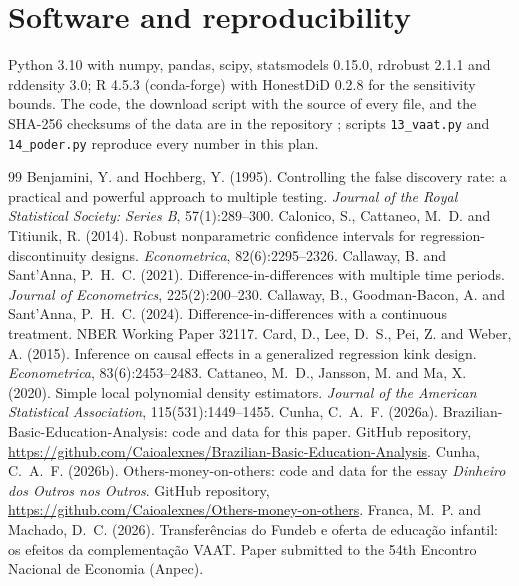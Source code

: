 \documentclass[11pt]{article}
\begin{document}
\section{Software and reproducibility}

Python 3.10 with numpy, pandas, scipy, statsmodels 0.15.0, rdrobust 2.1.1 and rddensity 3.0; R 4.5.3 (conda-forge) with HonestDiD 0.2.8 for the sensitivity bounds. The code, the download script with the source of every file, and the SHA-256 checksums of the data are in the repository \citep{cunha2026a}; scripts \texttt{13\_vaat.py} and \texttt{14\_poder.py} reproduce every number in this plan.

\begin{thebibliography}{99}
 Benjamini, Y. and Hochberg, Y. (1995). Controlling the false discovery rate: a practical and powerful approach to multiple testing. \textit{Journal of the Royal Statistical Society: Series B}, 57(1):289--300.
 Calonico, S., Cattaneo, M.~D. and Titiunik, R. (2014). Robust nonparametric confidence intervals for regression-discontinuity designs. \textit{Econometrica}, 82(6):2295--2326.
 Callaway, B. and Sant'Anna, P.~H.~C. (2021). Difference-in-differences with multiple time periods. \textit{Journal of Econometrics}, 225(2):200--230.
 Callaway, B., Goodman-Bacon, A. and Sant'Anna, P.~H.~C. (2024). Difference-in-differences with a continuous treatment. NBER Working Paper 32117.
 Card, D., Lee, D.~S., Pei, Z. and Weber, A. (2015). Inference on causal effects in a generalized regression kink design. \textit{Econometrica}, 83(6):2453--2483.
 Cattaneo, M.~D., Jansson, M. and Ma, X. (2020). Simple local polynomial density estimators. \textit{Journal of the American Statistical Association}, 115(531):1449--1455.
 Cunha, C.~A.~F. (2026a). Brazilian-Basic-Education-Analysis: code and data for this paper. GitHub repository, \url{https://github.com/Caioalexnes/Brazilian-Basic-Education-Analysis}.
 Cunha, C.~A.~F. (2026b). Others-money-on-others: code and data for the essay \textit{Dinheiro dos Outros nos Outros}. GitHub repository, \url{https://github.com/Caioalexnes/Others-money-on-others}.
 Franca, M.~P. and Machado, D.~C. (2026). Transferências do Fundeb e oferta de educação infantil: os efeitos da complementação VAAT. Paper submitted to the 54th Encontro Nacional de Economia (Anpec).

\end{thebibliography}
\end{document}
